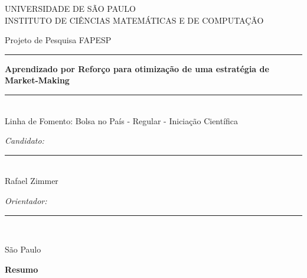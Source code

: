 \documentclass[12pt,a4paper]{article}
\begin{document}
\doublespacing

\begin{titlepage}
    \begin{center}
        {\large \sc UNIVERSIDADE DE SÃO PAULO} \\
        {\large \sc INSTITUTO DE CIÊNCIAS MATEMÁTICAS E DE COMPUTAÇÃO}\\[0.7cm]
        
        \vspace{4cm}

        {\large \sc Projeto de Pesquisa FAPESP}\\
        \rule{\linewidth}{2pt}
        
        \vspace{0.7em} %
        {\Large \bfseries Aprendizado por Reforço para otimização de uma estratégia de Market-Making }
        \vspace{0.2em} %
        
        \rule{\linewidth}{2pt} \\
        {\small \sc Linha de Fomento: Bolsa no País - Regular - Iniciação Científica}
    \end{center}
    
    \vspace{2.8cm}

    \begin{minipage}{0.43\textwidth}
        \emph{Candidato:}\\[2.08cm]
        \rule{0.9\linewidth}{0.3mm}\\
        Rafael Zimmer
    \end{minipage}
    \hspace{1cm}
    \begin{minipage}{0.43\textwidth}
        \emph{Orientador:}\\[2.08cm]
        \rule{0.9\linewidth}{0.3mm}\\
    \end{minipage}

    \vfill

    \begin{center}
        \makeatletter
        São Paulo \\
        \@date
        \makeatother
    \end{center}
\end{titlepage}


\pagestyle{empty}
\begin{center}
    {\bf \huge Resumo} \\[3em] %
\end{center}
% 

\end{document}
